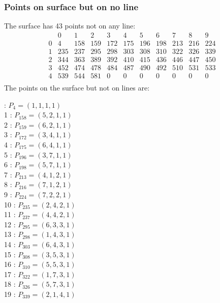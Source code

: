 \documentclass{article}
\begin{document}
{\subsubsection*{Points on surface but on no line}
The surface has 43 points not on any line:\\
$$
\begin{array}{r|*{10}{r}}
 & 0 & 1 & 2 & 3 & 4 & 5 & 6 & 7 & 8 & 9\\
\hline
0 & 4 & 158 & 159 & 172 & 175 & 196 & 198 & 213 & 216 & 224\\
1 & 235 & 237 & 295 & 298 & 303 & 308 & 310 & 322 & 326 & 339\\
2 & 344 & 363 & 389 & 392 & 410 & 415 & 436 & 446 & 447 & 450\\
3 & 452 & 474 & 478 & 484 & 487 & 490 & 492 & 510 & 531 & 533\\
4 & 539 & 544 & 581 & 0 & 0 & 0 & 0 & 0 & 0 & 0\\
\end{array}
$$
The points on the surface but not on lines are:\\
\begin{multicols}{2}
 : $P_{4}=( 1, 1, 1, 1 )$\\
1 : $P_{158}=( 5, 2, 1, 1 )$\\
2 : $P_{159}=( 6, 2, 1, 1 )$\\
3 : $P_{172}=( 3, 4, 1, 1 )$\\
4 : $P_{175}=( 6, 4, 1, 1 )$\\
5 : $P_{196}=( 3, 7, 1, 1 )$\\
6 : $P_{198}=( 5, 7, 1, 1 )$\\
7 : $P_{213}=( 4, 1, 2, 1 )$\\
8 : $P_{216}=( 7, 1, 2, 1 )$\\
9 : $P_{224}=( 7, 2, 2, 1 )$\\
10 : $P_{235}=( 2, 4, 2, 1 )$\\
11 : $P_{237}=( 4, 4, 2, 1 )$\\
12 : $P_{295}=( 6, 3, 3, 1 )$\\
13 : $P_{298}=( 1, 4, 3, 1 )$\\
14 : $P_{303}=( 6, 4, 3, 1 )$\\
15 : $P_{308}=( 3, 5, 3, 1 )$\\
16 : $P_{310}=( 5, 5, 3, 1 )$\\
17 : $P_{322}=( 1, 7, 3, 1 )$\\
18 : $P_{326}=( 5, 7, 3, 1 )$\\
19 : $P_{339}=( 2, 1, 4, 1 )$\\

\end{multicols}}
\end{document}
